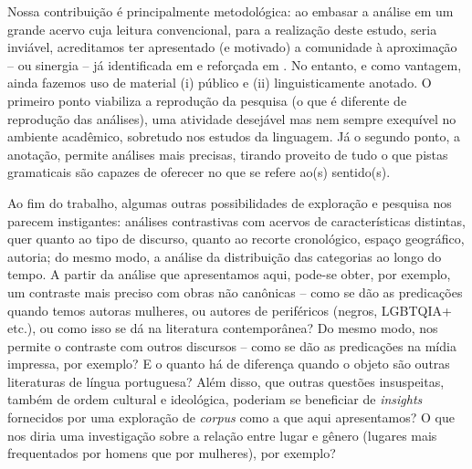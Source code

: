 \documentclass[portuguese]{textolivre}
\begin{document}
Nossa contribuição é principalmente metodológica: ao embasar a análise em um grande acervo cuja leitura convencional, para a realização deste estudo, seria inviável, acreditamos ter apresentado (e motivado) a comunidade à aproximação – ou sinergia – já identificada em \textcite{baker2008} e reforçada em \textcite{friginal2020}.  No entanto, e como vantagem, ainda fazemos uso de material (i) público e (ii) linguisticamente anotado. O primeiro ponto viabiliza a reprodução da pesquisa (o que é diferente de reprodução das análises), uma atividade desejável mas nem sempre exequível no ambiente acadêmico, sobretudo nos estudos da linguagem. Já o segundo ponto, a anotação, permite análises mais precisas, tirando proveito de tudo o que pistas gramaticais são capazes de oferecer no que se refere ao(s) sentido(s).

Ao fim do trabalho, algumas outras possibilidades de exploração e pesquisa nos parecem instigantes: análises contrastivas com acervos de características distintas, quer quanto ao tipo de discurso, quanto ao recorte cronológico, espaço geográfico, autoria; do mesmo modo, a análise da distribuição das categorias ao longo do tempo. A partir da análise que apresentamos aqui, pode-se obter, por exemplo, um contraste mais preciso com obras não canônicas – como se dão as predicações quando temos autoras mulheres, ou autores de periféricos (negros, LGBTQIA+ etc.), ou como isso se dá na literatura contemporânea? Do mesmo modo, nos permite o contraste com outros discursos – como se dão as predicações na mídia impressa, por exemplo? E o quanto há de diferença quando o objeto são outras literaturas de língua portuguesa? Além disso, que outras questões insuspeitas, também de ordem cultural e ideológica, poderiam se beneficiar de \textit{insights} fornecidos por uma exploração de \textit{corpus} como a que aqui apresentamos? O que nos diria uma investigação sobre a relação entre lugar e gênero (lugares mais frequentados por homens que por mulheres), por exemplo?
\end{document}
